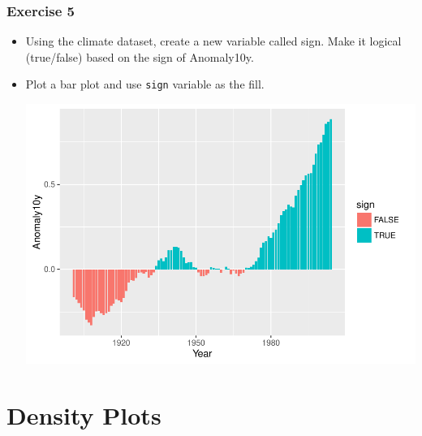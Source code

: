 \documentclass{beamer}\usepackage[]{graphicx}\usepackage[]{color}
\newenvironment{knitrout}{}{} %
\begin{document}
\begin{frame}[fragile]
\frametitle{Exercise 5}
\begin{itemize}
\item Using the climate dataset, create a new variable called sign. Make it logical (true/false) based on the sign of Anomaly10y.
\item Plot a bar plot and use \texttt{sign} variable as the fill.\\
\begin{knitrout}\footnotesize
{}\color{fgcolor}

{\centering \includegraphics[width=.75\linewidth]{figure/ex4-1} 

}



\end{knitrout}

\end{itemize}
\end{frame}


\section*{Density Plots}
\frame{\sectionpage}

\end{document}
